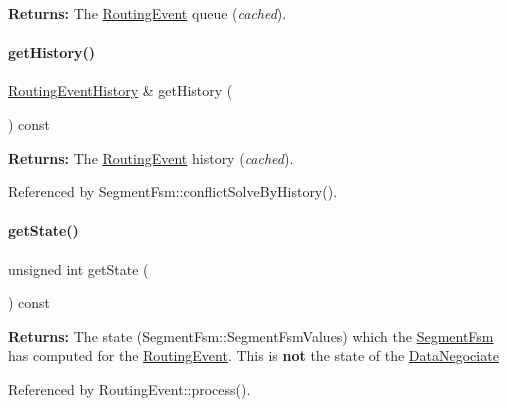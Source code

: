 {\bfseries Returns\+:} The \hyperlink{classKite_1_1RoutingEvent}{Routing\+Event} queue ({\itshape cached}). \mbox{\label{classKite_1_1SegmentFsm_a1bf115c7f375168ec89ec400d58440b4}} 
\paragraph{\texorpdfstring{get\+History()}{getHistory()}}
{\footnotesize\ttfamily \hyperlink{classKite_1_1RoutingEventHistory}{Routing\+Event\+History} \& get\+History (\begin{DoxyParamCaption}{ }\end{DoxyParamCaption}) const\hspace{0.3cm}{\ttfamily [inline]}}

{\bfseries Returns\+:} The \hyperlink{classKite_1_1RoutingEvent}{Routing\+Event} history ({\itshape cached}). 

Referenced by Segment\+Fsm\+::conflict\+Solve\+By\+History().

\mbox{\label{classKite_1_1SegmentFsm_a40ec2b23684a0e6e6d7ac9783a269037}} 
\paragraph{\texorpdfstring{get\+State()}{getState()}}
{\footnotesize\ttfamily unsigned int get\+State (\begin{DoxyParamCaption}{ }\end{DoxyParamCaption}) const\hspace{0.3cm}{\ttfamily [inline]}}

{\bfseries Returns\+:} The state (Segment\+Fsm\+::\+Segment\+Fsm\+Values) which the \hyperlink{classKite_1_1SegmentFsm}{Segment\+Fsm} has computed for the \hyperlink{classKite_1_1RoutingEvent}{Routing\+Event}. This is {\bfseries not} the state of the \hyperlink{classKite_1_1DataNegociate}{Data\+Negociate} 

Referenced by Routing\+Event\+::process().

\mbox{\label{classKite_1_1SegmentFsm_ad272e2f3fbbddcd6c8dc2f0187f08c4e}} 
